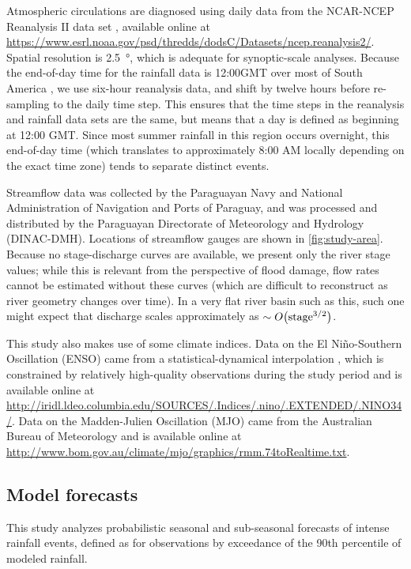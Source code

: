 \documentclass[twocol]{ametsoc}
\begin{document}
Atmospheric circulations are diagnosed using daily data from the NCAR-NCEP Reanalysis II data set \citep{Kanamitsu:2002kk}, available online at \url{https://www.esrl.noaa.gov/psd/thredds/dodsC/Datasets/ncep.reanalysis2/}.
Spatial resolution is \SI{2.5}{\degree}, which is adequate for synoptic-scale analyses.
Because the end-of-day time for the rainfall data is 12:00GMT over most of South America \citep{xie2010cpc}, we use six-hour reanalysis data, and shift by twelve hours before re-sampling to the daily time step.
This ensures that the time steps in the reanalysis and rainfall data sets are the same, but means that a day is defined as beginning at 12:00 GMT.
Since most summer rainfall in this region occurs overnight, this end-of-day time (which translates to approximately 8:00 AM locally depending on the exact time zone) tends to separate distinct events.

Streamflow data was collected by the Paraguayan Navy and National Administration of Navigation and Ports of Paraguay, and was processed and distributed by the Paraguayan Directorate of Meteorology and Hydrology (DINAC-DMH).
Locations of streamflow gauges are shown in \cref{fig:study-area}.
Because no stage-discharge curves are available, we present only the river stage values; while this is relevant from the perspective of flood damage, flow rates cannot be estimated without these curves (which are difficult to reconstruct as river geometry changes over time).
In a very flat river basin such as this, such one might expect that discharge scales approximately as $\sim O\qty(\text{stage}^{3/2})$.

This study also makes use of some climate indices.
Data on the El Ni\~{n}o-Southern Oscillation (ENSO) came from a statistical-dynamical interpolation \citep{Kaplan:1998df}, which is constrained by relatively high-quality observations during the study period and is available online at \url{http://iridl.ldeo.columbia.edu/SOURCES/.Indices/.nino/.EXTENDED/.NINO34/}.
Data on the Madden-Julien Oscillation (MJO) came from the Australian Bureau of Meteorology and is available online at \url{http://www.bom.gov.au/climate/mjo/graphics/rmm.74toRealtime.txt}.

\subsection{Model forecasts}

This study analyzes probabilistic seasonal and sub-seasonal forecasts of intense rainfall events, defined as for observations by exceedance of the 90th percentile of modeled rainfall.
\end{document}
